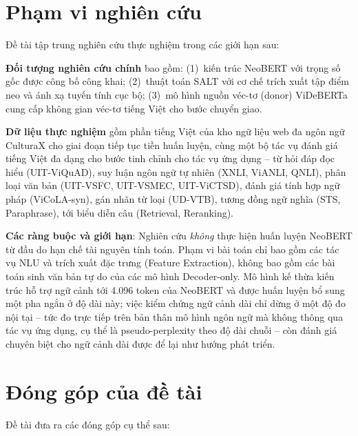 \section{Phạm vi nghiên cứu}
\label{sec:scope}

Đề tài tập trung nghiên cứu thực nghiệm trong các giới hạn sau:

\textbf{Đối tượng nghiên cứu chính} bao gồm: (1)~kiến trúc NeoBERT với trọng số
gốc được công bố công khai; (2)~thuật toán SALT với cơ chế trích xuất tập điểm neo và
ánh xạ tuyến tính cục bộ; (3)~mô hình nguồn véc-tơ (donor) ViDeBERTa cung cấp không
gian véc-tơ tiếng Việt cho bước chuyển giao.

\textbf{Dữ liệu thực nghiệm} gồm phần tiếng Việt của kho ngữ liệu web đa ngôn ngữ
CulturaX cho giai đoạn tiếp tục tiền huấn luyện, cùng một bộ tác vụ đánh giá tiếng Việt
đa dạng cho bước tinh chỉnh cho tác vụ ứng dụng -- từ hỏi đáp đọc hiểu (UIT-ViQuAD), suy luận
ngôn ngữ tự nhiên (XNLI, ViANLI, QNLI), phân loại văn bản (UIT-VSFC, UIT-VSMEC,
UIT-ViCTSD), đánh giá tính hợp ngữ pháp (ViCoLA-syn), gán nhãn từ loại (UD-VTB),
tương đồng ngữ nghĩa (STS, Paraphrase), tới biểu diễn câu (Retrieval, Reranking).

\textbf{Các ràng buộc và giới hạn}: Nghiên cứu \textit{không} thực hiện huấn luyện
NeoBERT từ đầu do hạn chế tài nguyên tính toán. Phạm vi bài toán chỉ bao gồm các
tác vụ NLU và trích xuất đặc trưng (Feature Extraction), không bao gồm các bài toán
sinh văn bản tự do của các mô hình Decoder-only. Mô hình kế thừa kiến trúc hỗ trợ
ngữ cảnh tới 4.096 token của NeoBERT và được huấn luyện bổ sung một pha ngắn ở độ
dài này; việc kiểm chứng ngữ cảnh dài chỉ dừng ở một độ đo nội tại -- tức đo trực tiếp
trên bản thân mô hình ngôn ngữ mà không thông qua tác vụ ứng dụng, cụ thể là
pseudo-perplexity theo độ dài chuỗi -- còn đánh giá chuyên biệt cho ngữ cảnh dài
được để lại như hướng phát triển.

\section{Đóng góp của đề tài}
\label{sec:contributions}

Đề tài đưa ra các đóng góp cụ thể sau:

